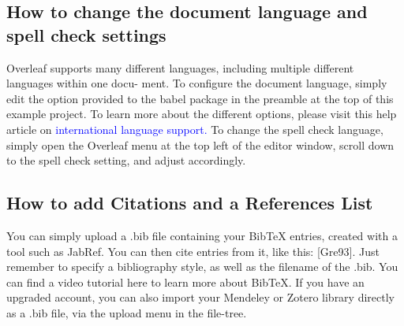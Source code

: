 \documentclass{article}
\begin{document}
\subsection{How to change the document language and spell check settings}
Overleaf supports many different languages, including multiple different languages within one docu-
ment.\newline
To configure the document language, simply edit the option provided to the babel package in the
preamble at the top of this example project. To learn more about the different options, please visit
this help article on \textcolor{blue}{international language support.}\newline
     To change the spell check language, simply open the Overleaf menu at the top left of the editor
window, scroll down to the spell check setting, and adjust accordingly.
\subsection{How to add Citations and a References List}
You can simply upload a .bib file containing your BibTeX entries, created with a tool such as JabRef.
You can then cite entries from it, like this: [Gre93]. Just remember to specify a bibliography style, as
well as the filename of the .bib. You can find a video tutorial here to learn more about BibTeX.\newline
If you have an upgraded account, you can also import your Mendeley or Zotero library directly as
a .bib file, via the upload menu in the file-tree.
\end{document}
